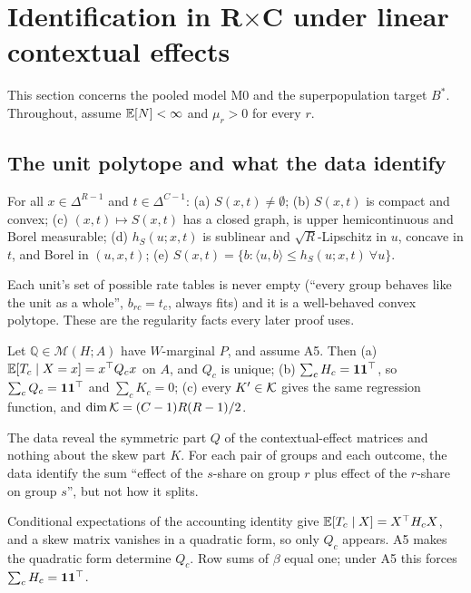 \section{Identification in \texorpdfstring{R$\times$C}{RxC} under linear contextual effects}\label{sec:rxc}

This section concerns the pooled model M0 and the superpopulation target $B^*$.
Throughout, assume $\mathbb E[N]<\infty$ and $\mu_r>0$ for every $r$.

\subsection{The unit polytope and what the data identify}

\begin{lemma}\label{lem:polytope}
For all $x\in\Delta^{R-1}$ and $t\in\Delta^{C-1}$: (a) $S(x,t)\neq\emptyset$;
(b) $S(x,t)$ is compact and convex; (c) $(x,t)\mapsto S(x,t)$ has a closed graph,
is upper hemicontinuous and Borel measurable; (d) $h_S(u;x,t)$ is sublinear and
$\sqrt R$-Lipschitz in $u$, concave in $t$, and Borel in $(u,x,t)$; (e)
$S(x,t)=\{b:\langle u,b\rangle\le h_S(u;x,t)\ \forall u\}$.
\end{lemma}
\begin{reading}
Each unit's set of possible rate tables is never empty (``every group behaves
like the unit as a whole'', $b_{rc}=t_c$, always fits) and it is a well-behaved
convex polytope. These are the regularity facts every later proof uses.
\end{reading}

\begin{lemma}\label{lem:decomp}
Let $\mathbb Q\in\mathcal M(H;A)$ have $W$-marginal $P$, and assume A5. Then
(a) $\mathbb E[T_c\mid X=x]=x^\top Q_cx$ on $A$, and $Q_c$ is unique;
(b) $\sum_cH_c=\mathbf 1\mathbf 1^\top$, so $\sum_cQ_c=\mathbf 1\mathbf 1^\top$ and $\sum_cK_c=0$;
(c) every $K'\in\mathcal K$ gives the same regression function, and
$\dim\mathcal K=(C-1)R(R-1)/2$.
\end{lemma}
\begin{reading}
The data reveal the symmetric part $Q$ of the contextual-effect matrices and
nothing about the skew part $K$. For each pair of groups and each outcome, the
data identify the sum ``effect of the $s$-share on group $r$ plus effect of the
$r$-share on group $s$'', but not how it splits.
\end{reading}
\begin{sketch}
Conditional expectations of the accounting identity give $\mathbb E[T_c\mid X]=X^\top
H_cX$, and a skew matrix vanishes in a quadratic form, so only $Q_c$ appears. A5
makes the quadratic form determine $Q_c$. Row sums of $\beta$ equal one; under A5
this forces $\sum_cH_c=\mathbf 1\mathbf 1^\top$.
\end{sketch}

